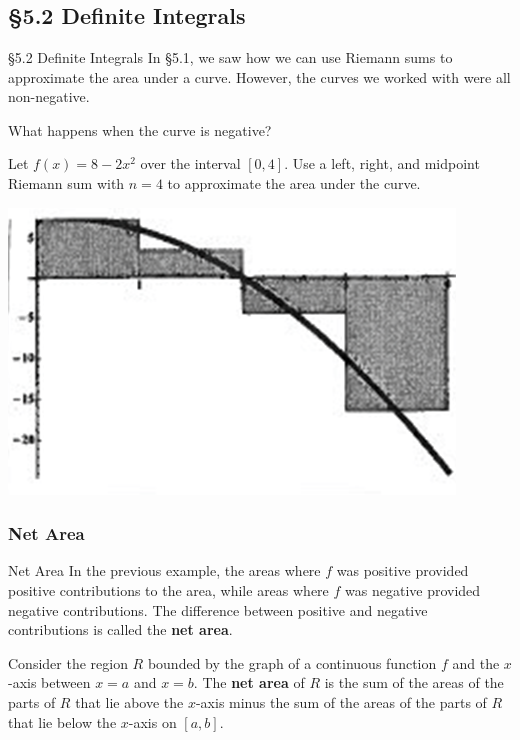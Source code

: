 \documentclass[cal1spr16Lectures.tex]{subfiles}
\begin{document}
\section[]{}

\subsection[5.2 Definite Integrals]{\S 5.2 Definite Integrals}

\begin{frame}{\S 5.2 Definite Integrals}\small
In \S 5.1, we saw how we can use Riemann sums to approximate the area under a curve.  However, the curves we worked with were all non-negative.
\begin{que} 
What happens when the curve is negative?
\end{que}
\end{frame}

\begin{frame}
\begin{ex} 
Let $f(x)=8-2x^2$ over the interval $[0,4]$.  Use a left, right, and midpoint Riemann sum with $n=4$ to approximate the area under the curve.

\begin{center}
\includegraphics[scale=0.75]{pictures/5p2example}
\end{center} 
\end{ex}
\end{frame}

\subsubsection{Net Area}

\begin{frame}{\small Net Area}\footnotesize
In the previous example, the areas where $f$ was positive provided positive contributions to the area, while areas where $f$ was negative provided negative contributions.  The difference between positive and negative contributions is called the {\bf net area}.
\begin{dfn} 
Consider the region $R$ bounded by the graph of a continuous function $f$ and the $x$-axis between $x=a$ and $x=b$.  The {\bf net area} of $R$ is the sum of the areas of the parts of $R$ that lie above the $x$-axis minus the sum of the areas of the parts of $R$ that lie below the $x$-axis on $[a,b]$. 
\end{dfn}
\end{frame}
\end{document}
